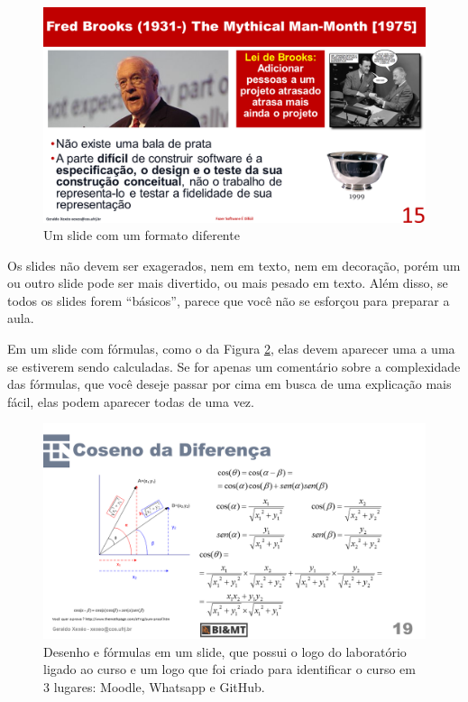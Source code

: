 \documentclass[12pt]{article}
\def\tam{0.5}
\begin{document}
\begin{figure}[htb]
    \centering
    \includegraphics[width=\tam\linewidth]{imagens/manmonth.png}
    \caption{Um slide com um formato diferente}
    \label{fig:man}
\end{figure}


Os slides não devem ser exagerados, nem em texto, nem em decoração, porém um ou outro slide pode ser mais divertido, ou mais pesado em texto. Além disso, se todos os slides forem ``básicos'', parece que você não se esforçou para preparar a aula.

Em um slide com fórmulas, como o da Figura \ref{fig:formulas}, elas devem aparecer uma a uma se estiverem sendo calculadas.
Se for apenas um comentário sobre a complexidade das fórmulas, que você deseje passar por cima em busca de uma explicação mais fácil, elas podem aparecer todas de uma vez.

\begin{figure}[hbt]
    \centering
    \includegraphics[width=\tam\linewidth]{imagens/desenhoeformulas.png}
    \caption{Desenho e fórmulas em um slide, que possui o logo do laboratório ligado ao curso e um logo que foi criado para identificar o curso em 3 lugares: Moodle, Whatsapp e GitHub.}
    \label{fig:formulas}
\end{figure}
\end{document}
